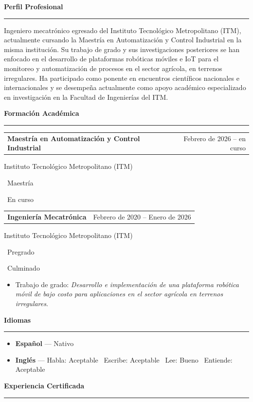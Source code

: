 \documentclass[10pt, letterpaper]{article}
\makeatletter
\newcommand{\SeccionCV}[1]{%
  \needspace{3\baselineskip}%
  \vspace{1.0em}%
  \noindent{\textcolor{AzulITM}{\rule{2.4mm}{2.4mm}}}\hspace{0.5em}%
  {\FuenteTitulo\large\color{AzulITM}\bfseries #1}\\[0.2em]%
  {\color{AzulDigital}\rule{\linewidth}{1.1pt}}%
  \vspace{0.4em}%
}
\newcommand{\ItemCV}[2]{%
  \par\noindent\begin{tabularx}{\linewidth}{@{}X r@{}}
    {\FuenteTitulo\normalsize\color{GrisPizarra}\bfseries #1} &
    {\FuenteCodigo\small\color{GrisMedio}#2}\\
  \end{tabularx}\par\vspace{0.1em}%
}
\newcommand{\NivelFormacion}[1]{%
  \colorbox{AzulITM!12}{\color{AzulITM}\small\bfseries\strut\ #1\ }}
\newcommand{\FormacionEnCurso}{%
  \colorbox{AzulDigital!15}{\color{AzulDigital!70!black}\small\bfseries\strut\ En curso\ }}
\newcommand{\FormacionCulminada}{%
  \colorbox{VerdeTarea!15}{\color{VerdeTarea}\small\bfseries\strut\ Culminado\ }}
\makeatother
\begin{document}
\SeccionCV{Perfil Profesional}
Ingeniero mecatrónico egresado del Instituto Tecnológico Metropolitano (ITM),
actualmente cursando la Maestría en Automatización y Control Industrial en la
misma institución. Su trabajo de grado y sus investigaciones posteriores se
han enfocado en el desarrollo de plataformas robóticas móviles e IoT para el
monitoreo y automatización de procesos en el sector agrícola, en terrenos
irregulares. Ha participado como ponente en encuentros científicos nacionales
e internacionales y se desempeña actualmente como apoyo académico
especializado en investigación en la Facultad de Ingenierías del ITM.

\SeccionCV{Formación Académica}

\ItemCV{Maestría en Automatización y Control Industrial}{Febrero de 2026 -- en curso}
Instituto Tecnológico Metropolitano (ITM)\quad\NivelFormacion{Maestría}\quad\FormacionEnCurso

\vspace{0.7em}

\ItemCV{Ingeniería Mecatrónica}{Febrero de 2020 -- Enero de 2026}
Instituto Tecnológico Metropolitano (ITM)\quad\NivelFormacion{Pregrado}\quad\FormacionCulminada
\begin{itemize}
  \item{} Trabajo de grado: \textit{Desarrollo e implementación de una
        plataforma robótica móvil de bajo costo para aplicaciones en el
        sector agrícola en terrenos irregulares}.
\end{itemize}

\SeccionCV{Idiomas}
\begin{itemize}
  \item{} \textbf{Español} --- Nativo
  \item{} \textbf{Inglés} --- Habla: Aceptable \textbullet\ Escribe:
        Aceptable \textbullet\ Lee: Bueno \textbullet\ Entiende: Aceptable
\end{itemize}

\SeccionCV{Experiencia Certificada}
\end{document}
